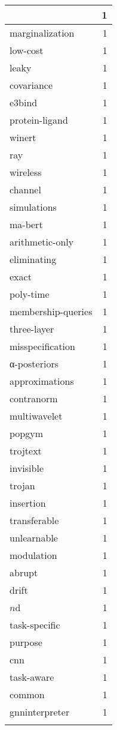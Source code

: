 \begin{table}[h]
\begin{tabular}{|l|r|}
{\hline
dropit & 1 \\
\hline
marginalization & 1 \\
\hline
low-cost & 1 \\
\hline
leaky & 1 \\
\hline
covariance & 1 \\
\hline
e3bind & 1 \\
\hline
protein-ligand & 1 \\
\hline
winert & 1 \\
\hline
ray & 1 \\
\hline
wireless & 1 \\
\hline
channel & 1 \\
\hline
simulations & 1 \\
\hline
ma-bert & 1 \\
\hline
arithmetic-only & 1 \\
\hline
eliminating & 1 \\
\hline
exact & 1 \\
\hline
poly-time & 1 \\
\hline
membership-queries & 1 \\
\hline
three-layer & 1 \\
\hline
misspecification & 1 \\
\hline
α-posteriors & 1 \\
\hline
approximations & 1 \\
\hline
contranorm & 1 \\
\hline
multiwavelet & 1 \\
\hline
popgym & 1 \\
\hline
trojtext & 1 \\
\hline
invisible & 1 \\
\hline
trojan & 1 \\
\hline
insertion & 1 \\
\hline
transferable & 1 \\
\hline
unlearnable & 1 \\
\hline
modulation & 1 \\
\hline
abrupt & 1 \\
\hline
drift & 1 \\
\hline
$n$d & 1 \\
\hline
task-specific & 1 \\
\hline
purpose & 1 \\
\hline
cnn & 1 \\
\hline
task-aware & 1 \\
\hline
common & 1 \\
\hline
gnninterpreter & 1 \\
}
\end{tabular}
\end{table}

